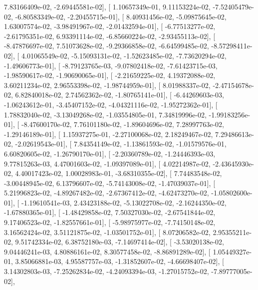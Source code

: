 \documentclass{article}
\begin{document}
          7.83166409e-02,  -2.69445581e-02],
       [  1.10657349e-01,   9.11153224e-02,  -7.52405479e-02,
         -6.80583349e-02,  -2.20455715e-01],
       [  8.40931456e-02,  -5.09875645e-02,   1.63007574e-02,
         -3.98491967e-02,  -2.01432594e-01],
       [ -6.77513277e-02,  -2.61795351e-02,   6.93391114e-02,
         -6.85660224e-02,  -2.93455113e-02],
       [ -8.47876697e-02,   7.51073628e-02,  -9.29366858e-02,
         -6.64599485e-02,  -8.57298411e-02],
       [  4.01065549e-02,  -5.15093131e-02,  -1.52623485e-02,
         -7.73620294e-02,  -1.49606773e-01],
       [ -8.79123765e-03,  -9.07802418e-02,  -7.61423715e-03,
         -1.98590617e-02,  -1.90690065e-01],
       [ -2.21659225e-02,   4.19372088e-02,   3.60211234e-02,
          2.96553398e-02,  -1.98744959e-01],
       [  8.01988337e-02,  -2.47154678e-02,   6.82840018e-02,
          2.74562362e-02,  -1.80765141e-01],
       [ -6.44269603e-03,  -1.06243612e-01,  -3.45407152e-02,
         -4.04321116e-02,  -1.95272362e-01],
       [  1.78832040e-02,  -3.13049268e-02,  -1.03554805e-01,
          7.34819996e-02,  -1.99183256e-01],
       [ -8.47600170e-02,   7.76101180e-02,  -1.89604696e-02,
          7.28997763e-02,  -1.29146189e-01],
       [  1.15937275e-01,  -2.27100068e-02,   2.18249467e-02,
          7.29486613e-02,  -2.02619543e-01],
       [  7.84354149e-02,  -1.13861593e-02,  -1.01579576e-01,
          6.60820605e-02,  -1.26790170e-01],
       [ -2.20360789e-02,  -1.24446393e-03,   9.77815263e-03,
          4.47001603e-02,  -1.09397089e-01],
       [  4.02214987e-02,  -2.43645930e-02,   4.40017423e-02,
          1.00028983e-01,  -3.68310355e-02],
       [  7.74483548e-02,  -3.00448945e-02,   6.13796607e-02,
         -5.74143008e-02,  -1.47039037e-01],
       [  5.21996823e-02,  -4.89267482e-02,  -2.67367412e-02,
         -4.62473270e-02,  -1.05802600e-01],
       [ -1.19610541e-03,   2.43423188e-02,  -5.13022708e-02,
         -2.16244350e-02,  -1.67880365e-01],
       [ -1.48429858e-02,   7.50327030e-02,  -2.67541844e-02,
          9.17406523e-02,  -1.82557661e-01],
       [ -5.98975977e-02,  -7.74150148e-02,   3.16562424e-02,
          3.51121875e-02,  -1.03501752e-01],
       [  8.07206582e-02,   2.95355211e-02,   9.51742334e-02,
          6.38752180e-03,  -7.14697414e-02],
       [ -3.53020138e-02,   9.04446241e-03,   4.80886161e-02,
          8.30577458e-02,  -8.86891289e-02],
       [  1.05449327e-01,   3.85066881e-03,   4.95587757e-03,
         -1.31852607e-02,  -4.66698407e-02],
       [  3.14302803e-03,  -7.25262834e-02,  -4.24093394e-03,
         -1.27015752e-02,  -7.89777005e-02],
\end{document}
